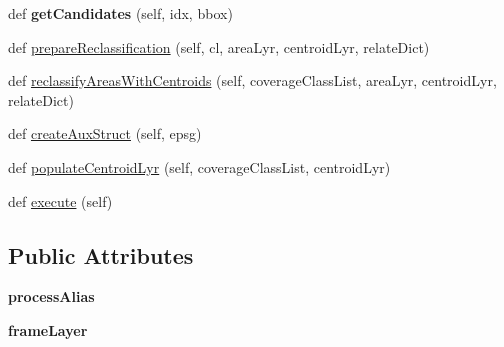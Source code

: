 \begin{DoxyCompactItemize}
\item 
\mbox{\label{class_dsg_tools_1_1_validation_tools_1_1_validation_processes_1_1close_earth_coverage_polygons_pcbfc5684de655aabbd7cec48624aa747_af34f0ffd38fa93f4e49d986e3b57b7d1}} 
def {\bfseries get\+Candidates} (self, idx, bbox)
\item 
def \mbox{\hyperlink{class_dsg_tools_1_1_validation_tools_1_1_validation_processes_1_1close_earth_coverage_polygons_pcbfc5684de655aabbd7cec48624aa747_ab8f31c97e5564aeb498f3c289c5123d9}{prepare\+Reclassification}} (self, cl, area\+Lyr, centroid\+Lyr, relate\+Dict)
\item 
def \mbox{\hyperlink{class_dsg_tools_1_1_validation_tools_1_1_validation_processes_1_1close_earth_coverage_polygons_pcbfc5684de655aabbd7cec48624aa747_a1c9eacfba3e9a9c52827e28ec3c9f5a6}{reclassify\+Areas\+With\+Centroids}} (self, coverage\+Class\+List, area\+Lyr, centroid\+Lyr, relate\+Dict)
\item 
def \mbox{\hyperlink{class_dsg_tools_1_1_validation_tools_1_1_validation_processes_1_1close_earth_coverage_polygons_pcbfc5684de655aabbd7cec48624aa747_a482ecf715cbe9a4b5d99ac627f3abd62}{create\+Aux\+Struct}} (self, epsg)
\item 
def \mbox{\hyperlink{class_dsg_tools_1_1_validation_tools_1_1_validation_processes_1_1close_earth_coverage_polygons_pcbfc5684de655aabbd7cec48624aa747_a150351756fbd03b76bf6b919d8810470}{populate\+Centroid\+Lyr}} (self, coverage\+Class\+List, centroid\+Lyr)
\item 
def \mbox{\hyperlink{class_dsg_tools_1_1_validation_tools_1_1_validation_processes_1_1close_earth_coverage_polygons_pcbfc5684de655aabbd7cec48624aa747_aa31b4fa53d1ebc98e42f3af6d5e4df2f}{execute}} (self)
\end{DoxyCompactItemize}
\subsection*{Public Attributes}
\begin{DoxyCompactItemize}
\item 
\mbox{\label{class_dsg_tools_1_1_validation_tools_1_1_validation_processes_1_1close_earth_coverage_polygons_pcbfc5684de655aabbd7cec48624aa747_a7885bac4e83f20f528c88792020e11af}} 
{\bfseries process\+Alias}
\item 
\mbox{\label{class_dsg_tools_1_1_validation_tools_1_1_validation_processes_1_1close_earth_coverage_polygons_pcbfc5684de655aabbd7cec48624aa747_ae80e69421d9aa793ae6a4f6a7cc2bb93}} 
{\bfseries frame\+Layer}
\end{DoxyCompactItemize}



